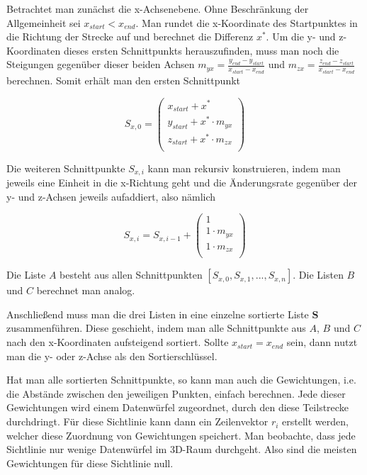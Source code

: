 Betrachtet man zunächst die x-Achsenebene. Ohne Beschränkung der Allgemeinheit sei $x_{start} < x_{end}$. Man rundet die x-Koordinate des Startpunktes in die Richtung der Strecke auf und berechnet die Differenz $x^{\ast}$. Um die y- und z-Koordinaten dieses ersten Schnittpunkts herauszufinden, muss man noch die Steigungen gegenüber dieser beiden Achsen $m_{yx} = \frac{y_{end} - y_{start}}{x_{start} - x_{end}}$ und $m_{zx} = \frac{z_{end} - z_{start}}{x_{start} - x_{end}}$ berechnen. Somit erhält man den ersten Schnittpunkt

\begin{equation}
  S_{x,0} = \begin{pmatrix}
    x_{start} + x^{\ast} \\
    y_{start} + x^{\ast} \cdot m_{yx} \\
    z_{start} + x^{\ast} \cdot m_{zx} \\
  \end{pmatrix}
\end{equation}

Die weiteren Schnittpunkte $S_{x,i}$ kann man rekursiv konstruieren, indem man jeweils eine Einheit in die x-Richtung geht und die Änderungsrate gegenüber der y- und z-Achsen jeweils aufaddiert, also nämlich

\begin{equation}
  S_{x,i} = S_{x,i-1} + \begin{pmatrix}
    1 \\
    1 \cdot m_{yx} \\
    1 \cdot m_{zx} \\
  \end{pmatrix}
\end{equation}

 Die Liste $A$ besteht aus allen Schnittpunkten $[S_{x,0}, S_{x,1}, ..., S_{x,n}]$. Die Listen $B$ und $C$ berechnet man analog.

Anschließend muss man die drei Listen in eine einzelne sortierte Liste $\mathbf{S}$ zusammenführen. Diese geschieht, indem man alle Schnittpunkte aus $A$, $B$ und $C$ nach den x-Koordinaten aufsteigend sortiert. Sollte $x_{start} = x_{end}$ sein, dann nutzt man die y- oder z-Achse als den Sortierschlüssel.

Hat man alle sortierten Schnittpunkte, so kann man auch die Gewichtungen, i.e. die Abstände zwischen den jeweiligen Punkten, einfach berechnen. Jede dieser Gewichtungen wird einem Datenwürfel zugeordnet, durch den diese Teilstrecke durchdringt. Für diese Sichtlinie kann dann ein Zeilenvektor $r_i$ erstellt werden, welcher diese Zuordnung von Gewichtungen speichert. Man beobachte, dass jede Sichtlinie nur wenige Datenwürfel im 3D-Raum durchgeht. Also sind die meisten Gewichtungen für diese Sichtlinie null.


